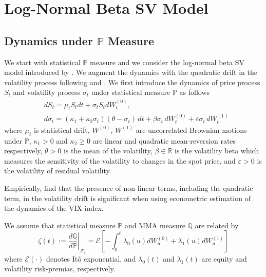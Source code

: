 \documentclass[pdftex,11pt,a4paper] {article}
\begin{document}
\section{Log-Normal Beta SV Model}\label{sec:model_dynam}

\subsection{Dynamics under $\mathbb{P}$ Measure}\label{sec:logsv_quadrift}

We start with statistical $\mathbb{P}$ measure and we consider the log-normal beta SV model introduced by \cite{Sepp2012}. We augment the dynamics with the quadratic drift in the volatility process following \cite{Lewis2019} and \cite{CarrWill}. 
We first introduce the dynamics of price process $S_{t}$ and volatility process $\sigma_{t}$ under statistical measure $\mathbb{P}$ as follows
\begin{equation}\label{eq:logsv_quadrift_P}
\begin{split}
&dS_t= \mu_{t}S_{t}dt+\sigma_t S_{t} dW^{(0)}_t,\\
&d\sigma_t=(\kappa_1+\kappa_2\sigma_t)(\theta-\sigma_t)\,dt+\beta\sigma_t\,dW^{(0)}_t+\varepsilon\sigma_t\,dW^{(1)}_t
\end{split}
\end{equation}
where $\mu_{t}$ is statistical drift, $W^{(0)}$, $W^{(1)}$ are uncorrelated Brownian motions under $\mathbb{P}$, $\kappa_1>0$ and $\kappa_2 \geq 0$ are linear and quadratic mean-reversion rates respectively, $\theta>0$ is the mean of the volatility, $\beta\in\mathbb{R}$ is the volatility beta which measures the sensitivity of the volatility to changes in the spot price, and $\varepsilon>0$ is the volatility of residual volatility.

Empirically, \cite{Bakshi2006} find that the presence of non-linear terms, including the quadratic term, in the volatility drift is significant when using econometric estimation of the dynamics of the VIX index.

We assume that statistical measure $\mathbb{P}$ and MMA measure $\mathbb{Q}$ are related by
\begin{equation}\label{eq:RadonNikodym_logsv_quad}
\zeta(t):=\left.\frac{d\mathbb{Q}}{d\mathbb{P}}\right|_{\mathcal{F}_t}=\mathcal{E}\left[-\int_0^t \lambda_0(u)dW^{(0)}_u+\lambda_1(u)dW^{(1)}_u\right]
\end{equation}
where $\mathcal{E}(\cdot)$ denotes It\^{o} exponential, and $\lambda_0(t)$ and $\lambda_1(t)$ are equity and volatility risk-premias, respectively.
\end{document}

